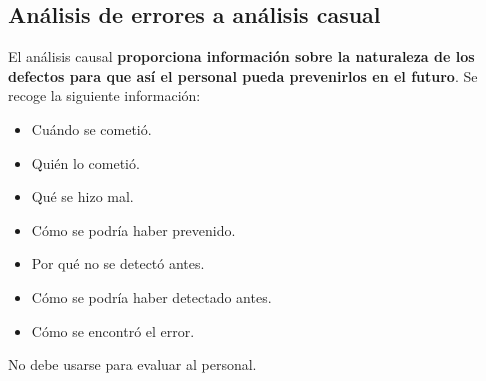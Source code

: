 \subsection{Análisis de errores a análisis casual}
El análisis causal \textbf{proporciona información sobre la naturaleza de los defectos para que así el personal pueda prevenirlos en el futuro}. Se recoge la siguiente información:
\begin{itemize}
    \item Cuándo se cometió.
    \item Quién lo cometió.
    \item Qué se hizo mal.
    \item Cómo se podría haber prevenido.
    \item Por qué no se detectó antes.
    \item Cómo se podría haber detectado antes.
    \item Cómo se encontró el error.
\end{itemize}

No debe usarse para evaluar al personal.

